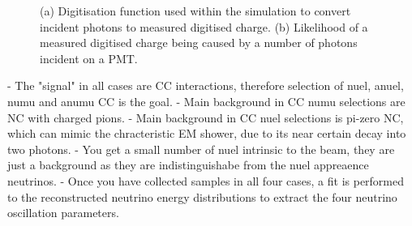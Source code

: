 \begin{figure} %
    \centering
    \quad
    \caption[Simulation PMT digitisaion function.]
    {(a) Digitisation function used within the simulation to convert incident photons to measured
        digitised charge. (b) Likelihood of a measured digitised charge being caused by a number
        of photons incident on a PMT.}
    \label{fig:digitisation}
\end{figure}

- The "signal" in all cases are CC interactions, therefore selection of nuel, anuel, numu and
anumu CC is the goal.
- Main background in CC numu selections are NC with charged pions.
- Main background in CC nuel selections is pi-zero NC, which can mimic the chracteristic EM
shower, due to its near certain decay into two photons.
- You get a small number of nuel intrinsic to the beam, they are just a background as they are
indistinguishabe from the nuel appreaence neutrinos.
- Once you have collected samples in all four cases, a fit is performed to the reconstructed
neutrino energy distributions to extract the four neutrino oscillation parameters.